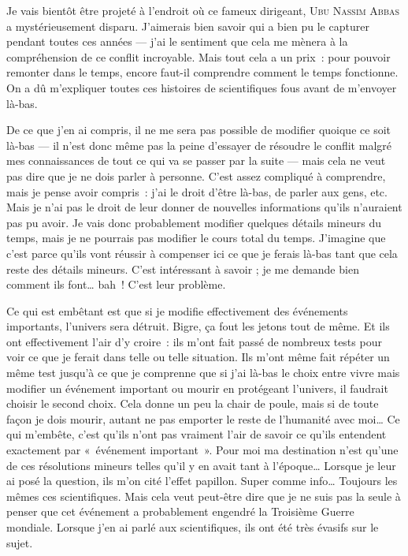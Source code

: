{	Je vais bientôt être projeté à l’endroit où ce fameux dirigeant, \textsc{Ubu Nassim Abbas} a mystérieusement disparu.
	J’aimerais bien savoir qui a bien pu le capturer pendant toutes ces années — j’ai le sentiment que cela me mènera à la compréhension de ce conflit incroyable.
	Mais tout cela a un prix~:  pour pouvoir remonter dans le temps, encore faut-il comprendre comment le temps fonctionne.
	On a dû m’expliquer toutes ces histoires de scientifiques fous avant de m’envoyer là-bas.

	De ce que j’en ai compris, il ne me sera pas possible de modifier quoique ce soit là-bas — il n’est donc même pas la peine d’essayer de résoudre le conflit malgré mes connaissances de tout ce qui va se passer par la suite — mais cela ne veut pas dire que je ne dois parler à personne.
	C’est assez compliqué à comprendre, mais je pense avoir compris~:  j’ai le droit d’être là-bas, de parler aux gens, etc.  Mais je n’ai pas le droit de leur donner de nouvelles informations qu’ils n’auraient pas pu avoir.
	Je vais donc probablement modifier quelques détails mineurs du temps, mais je ne pourrais pas modifier le cours total du temps.
	J’imagine que c’est parce qu’ils vont réussir à compenser ici ce que je ferais là-bas tant que cela reste des détails mineurs.  C’est intéressant à savoir ; je me demande bien comment ils font… bah~!  C’est leur problème.

	Ce qui est embêtant est que si je modifie effectivement des événements importants, l’univers sera détruit.
	Bigre, ça fout les jetons tout de même.
	Et ils ont effectivement l’air d’y croire~:  ils m’ont fait passé de nombreux tests pour voir ce que je ferait dans telle ou telle situation.
	Ils m’ont même fait répéter un même test jusqu’à ce que je comprenne que si j’ai là-bas le choix entre vivre mais modifier un événement important ou mourir en protégeant l’univers, il faudrait choisir le second choix.
	Cela donne un peu la chair de poule, mais si de toute façon je dois mourir, autant ne pas emporter le reste de l’humanité avec moi…
	Ce qui m’embête, c’est qu’ils n’ont pas vraiment l’air de savoir ce qu’ils entendent exactement par «~événement important~».
	Pour moi ma destination n’est qu’une de ces résolutions mineurs telles qu’il y en avait tant à l’époque…  Lorsque je leur ai posé la question, ils m’on cité l’effet papillon.  Super comme info…  Toujours les mêmes ces scientifiques.
	Mais cela veut peut-être dire que je ne suis pas la seule à penser que cet événement a probablement engendré la Troisième Guerre mondiale.
	Lorsque j’en ai parlé aux scientifiques, ils ont été très évasifs sur le sujet.

}
